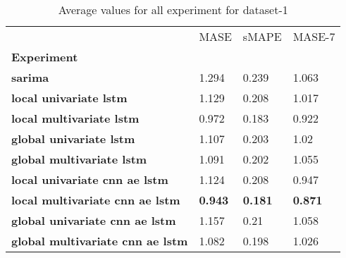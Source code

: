 \begin{table}[H]
\centering
\caption{Average values for all experiment for dataset-1}
\label{table:Average-metric-dataset-1}
\begin{tabular}{llll}
\toprule
{} &            MASE &           sMAPE &          MASE-7 \\
\textbf{Experiment                     } &                 &                 &                 \\
\midrule
\textbf{sarima                         } &           1.294 &           0.239 &           1.063 \\
\textbf{local univariate lstm          } &           1.129 &           0.208 &           1.017 \\
\textbf{local multivariate lstm        } &           0.972 &           0.183 &           0.922 \\
\textbf{global univariate lstm         } &           1.107 &           0.203 &            1.02 \\
\textbf{global multivariate lstm       } &           1.091 &           0.202 &           1.055 \\
\textbf{local univariate cnn ae lstm   } &           1.124 &           0.208 &           0.947 \\
\textbf{local multivariate cnn ae lstm } &  \textbf{0.943} &  \textbf{0.181} &  \textbf{0.871} \\
\textbf{global univariate cnn ae lstm  } &           1.157 &            0.21 &           1.058 \\
\textbf{global multivariate cnn ae lstm} &           1.082 &           0.198 &           1.026 \\
\bottomrule
\end{tabular}
\end{table}
